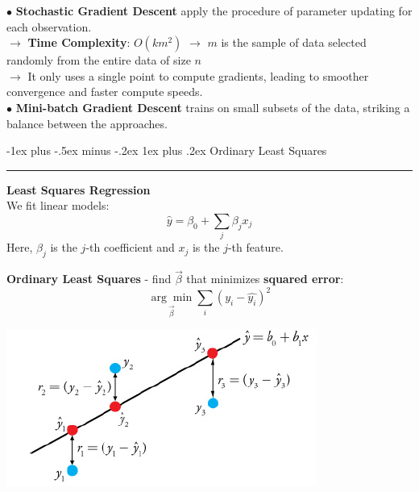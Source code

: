 \documentclass[letterpaper, 10.5pt,landscape]{article}
\makeatletter
\renewcommand{\subsubsection}{\@startsection{subsubsection}{3}{0mm}%
                                {-1ex plus -.5ex minus -.2ex}%
                                {1ex plus .2ex}%
                                {\normalfont\small\bfseries}}
\makeatother
\begin{document}
\begin{multicols*}{3}
$\bullet$ \textbf{Stochastic Gradient Descent} apply the procedure of parameter updating for each observation. \\
$\rightarrow$ \textbf{Time Complexity}: \(O(km^{2}) \) $\rightarrow$ $m$ is the sample of data selected randomly from the entire data of size $n$ \\
$\rightarrow$ It only uses a single point to compute gradients, leading to smoother convergence and faster compute speeds.  \\

$\bullet$ \textbf{Mini-batch Gradient Descent} trains on small subsets of the data, striking a balance between the approaches.







\subsubsection{Ordinary Least Squares} {\color{teal}\hrule height 0.5pt} \smallskip

\textbf{Least Squares Regression}\\
We fit linear models: 
\vspace{-5pt}
\[\boxed{\hat{y} = \beta_{0} + \sum_{j}\beta_{j}x_{j}}\]
Here, $\beta_{j}$ is the $j$-th coefficient and $x_{j}$ is the $j$-th feature.

\textbf{Ordinary Least Squares} - find $\Vec{\beta}$ that minimizes \textbf{squared error}:
\vspace{-3pt}
\[ \boxed{ \underset{\vec{\beta}} {\arg\min} \sum_{i} \left(y_{i} - \hat{y_{i}}  \right)^2} \]

\begin{center}
    \begin{minipage}{0.75\linewidth}
    \includegraphics[width=\textwidth]{figures/ordinary_least_square.PNG}
\end{minipage}
\end{center}



\end{multicols*}
\end{document}
